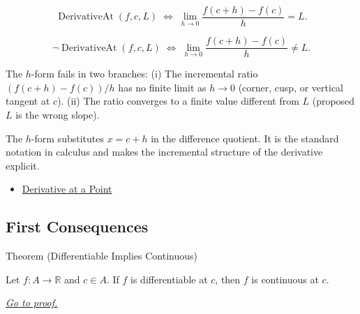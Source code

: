 \begin{remark*}
\[
\operatorname{DerivativeAt}(f,c,L)
\;\Longleftrightarrow\;
\lim_{h\to 0}\frac{f(c+h)-f(c)}{h} = L.
\]
\end{remark*}

\begin{remark*}
\[
\neg\operatorname{DerivativeAt}(f,c,L)
\;\Longleftrightarrow\;
\lim_{h\to 0}\frac{f(c+h)-f(c)}{h} \neq L.
\]
\end{remark*}

\begin{remark*}
The $h$-form fails in two branches: (i) The incremental ratio $(f(c+h)-f(c))/h$ has no finite limit as $h \to 0$ (corner, cusp, or vertical tangent at $c$). (ii) The ratio converges to a finite value different from $L$ (proposed $L$ is the wrong slope).
\end{remark*}

\begin{remark*}[Interpretation]
The $h$-form substitutes $x = c + h$ in the difference quotient. It is the standard notation in calculus and makes the incremental structure of the derivative explicit.
\end{remark*}

\begin{dependencies}
\begin{itemize}
  \item \hyperref[def:derivative-at-a-point]{Derivative at a Point}
\end{itemize}
\end{dependencies}


\subsection{First Consequences}

\begin{theorembox}{Theorem (Differentiable Implies Continuous)}
\begin{theorem}
\label{thm:differentiable-implies-continuous}
Let $f : A \to \mathbb{R}$ and $c \in A$. If $f$ is differentiable at $c$, then $f$ is continuous at $c$.

\smallskip\noindent
\hyperref[prf:differentiable-implies-continuous]{\textit{Go to proof.}}
\end{theorem}
\end{theorembox}

